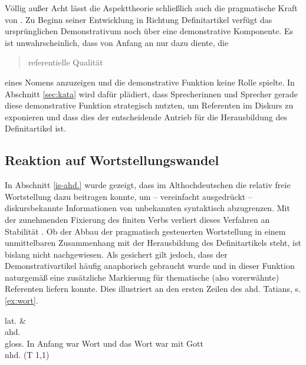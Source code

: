 Völlig außer Acht lässt die Aspekttheorie schließlich auch die pragmatische Kraft von . Zu Beginn seiner Entwicklung in Richtung Definitartikel verfügt das ursprünglichen Demonstrativum noch über eine demonstrative Komponente. Es ist unwahrscheinlich, dass  von Anfang an nur dazu diente, die \blockcquote[281]{Leiss2000}{referentielle Qualität} eines Nomens anzuzeigen und die demonstrative Funktion keine Rolle spielte. In Abschnitt \ref{sec:kata} wird dafür plädiert, dass Sprecherinnen und Sprecher gerade diese demonstrative Funktion strategisch nutzten, um Referenten im Diskurs zu exponieren und dass dies der entscheidende Antrieb für die Herausbildung des Definitartikel ist. 

\subsection{Reaktion auf Wortstellungswandel} \label{wortstellungswandel}

In Abschnitt \ref{is-ahd.} wurde gezeigt, dass im Althochdeutschen die relativ freie Wortstellung dazu beitragen konnte, um -- vereinfacht ausgedrückt -- diskursbekannte Informationen von unbekannten syntaktisch abzugrenzen. Mit der zunehmenden Fixierung des finiten Verbs verliert dieses Verfahren an Stabilität \parencite{Hinterholzl2010}. Ob der Abbau der pragmatisch gesteuerten Wortstellung in einem unmittelbaren Zusammenhang mit der Herausbildung des Definitartikels steht, ist bislang nicht nachgewiesen. Als gesichert gilt jedoch, dass der Demonstrativartikel häufig anaphorisch gebraucht wurde \parencite{Jager1918, Oubouzar1992} und in dieser Funktion naturgemäß eine zusätzliche Markierung für thematische (also vorerwähnte) Referenten liefern konnte. Dies illustriert \textcite[161]{Leiss2000} an den ersten Zeilen des ahd. Tatians, s. \ref{ex:wort}.

\begin{exe} 
\ex \label{ex:wort} 
\glll lat.      \& {}    \\
	ahd.           \\
	gloss. In Anfang war Wort und das Wort war mit Gott \\
	\trans nhd.   (T 1,1)
	\end{exe}

